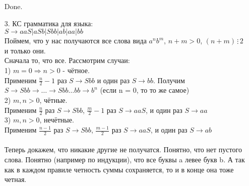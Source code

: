 \documentclass[12pt]{article}
\begin{document}
\begin{enumerate}
Done.
\item[3.] КС грамматика для языка:\\
$S \to aaS|aSb|Sbb|ab|aa|bb$\\
Поймем, что у нас получаются все слова вида $a^nb^m$, $n + m > 0$, $(n + m) \, \vdots \, 2$ и только они.\\
Сначала то, что все. Рассмотрим случаи:\\
1) $m = 0 \Rightarrow n>0$ - чётное.\\
Применим $\frac{n}{2} - 1$ раз $S \to Sbb$ и один раз $S \to bb$. Получим $S \to Sbb \to \dots \to Sbb \dots bb \to b^n$ (если n = 0, то то же самое)\\
2) $m, n > 0$, чётные.\\
Применим $\frac{n}{2}$ раз $S \to Sbb$,  $\frac{m}{2}-1$ раз $S \to aaS$, и один раз $S \to aa$\\
3) $m, n > 0$, нечётные.\\
Применим $\frac{n-1}{2}$ раз  $S \to Sbb$,  $\frac{m-1}{2}$ раз $S \to aaS$, и один раз $S \to ab$\\\\
Теперь докажем, что никакие другие не получатся. Понятно, что нет пустого слова. Понятно (например по индукции), что все буквы a левее букв b. А так как в каждом правиле четность суммы сохраняется, то и в конце она тоже четная.
 \end{enumerate}
\end{document}
